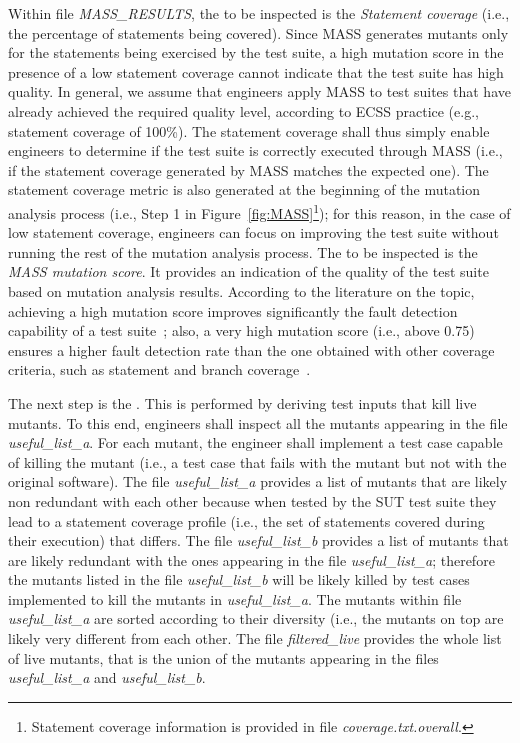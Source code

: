 Within file \emph{MASS\_RESULTS}, the  to be inspected is the \emph{Statement coverage} (i.e., the percentage of statements being covered). Since MASS generates mutants only for the statements being exercised by the test suite, a high mutation score in the presence of a low statement coverage cannot indicate that the test suite has high quality. In general, we assume that engineers apply MASS to test suites that have already achieved the required quality level, according to ECSS practice (e.g., statement coverage of 100\%). The statement coverage shall thus simply enable engineers to determine if the test suite is correctly executed through MASS (i.e., if the statement coverage generated by MASS matches the expected one). The statement coverage metric is also generated at the beginning of the mutation analysis process (i.e., Step 1 in Figure~\ref{fig:MASS}\footnote{Statement coverage information is provided in file \emph{coverage.txt.overall}.}); for this reason, in the case of low statement coverage, engineers can focus on improving the test suite without running the rest of the mutation analysis process. The  to be inspected is the \emph{MASS mutation score}. It provides an indication of the quality of the test suite based on mutation analysis results. According to the literature on the topic, 
 achieving a high mutation score improves significantly the fault detection capability of a test suite~\cite{papadakis2018mutation}; also, a very high mutation score (i.e., above 0.75) ensures a higher fault detection rate than the one obtained with other coverage criteria, such as statement and branch coverage~\cite{Chekam:17}.


The next step is the . This is performed by deriving test inputs that kill live mutants. 
To this end, engineers shall inspect all the mutants appearing in the file \emph{useful\_list\_a}. For each mutant, the engineer shall implement a test case capable of killing the mutant (i.e., a test case that fails with the mutant but not with the original software). 
The file \emph{useful\_list\_a} provides a list of mutants that are likely non redundant with each other because when tested by the SUT test suite they lead to a statement coverage profile (i.e., the set of statements covered during their execution) that differs. 
The file \emph{useful\_list\_b} provides a list of mutants that are likely redundant with the ones appearing in the file \emph{useful\_list\_a}; therefore the mutants listed in the file \emph{useful\_list\_b} will be likely killed by test cases implemented to kill the mutants in \emph{useful\_list\_a}.
The mutants within file \emph{useful\_list\_a} are sorted according to their diversity (i.e., the mutants on top are likely very different from each other. 
The file \emph{filtered\_live} provides the whole list of live mutants, that is the union of the mutants appearing in the files
\emph{useful\_list\_a} and \emph{useful\_list\_b}.

